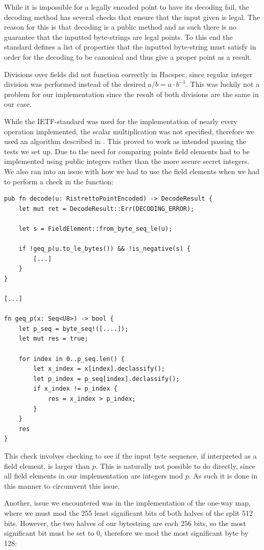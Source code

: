 \documentclass{article}
\newcommand*\ttvar[1]{\texttt{\expandafter\dottvar\detokenize{#1}\relax}}
\newcommand*\dottvar[1]{\ifx\relax#1\else
  \expandafter\ifx\string_#1\string_\allowbreak\else#1\fi
  \expandafter\dottvar\fi}
\begin{document}
While it is impossible for a legally encoded point to have its decoding
fail, the decoding method has several checks that ensure that the input
given is legal. The reason for this is that decoding is a public method
and as such there is no guarantee that the inputted byte-strings are
legal points. To this end the standard defines a list of properties
that the inputted byte-string must satisfy in order for the decoding
to be canonical and thus give a proper point as a result.

Divisions over fields did not function correctly in Hacspec, since regular integer division was performed instead of the desired $a/b = a \cdot b^{-1}$. This was luckily not a problem for our implementation since the result of both divisions are the same in our case.

While the IETF-standard was used for the implementation of nearly every
operation implemented, the scalar multiplication was not specified,
therefore we used an algorithm described in \cite{elliptic-curves}. This
proved to work as intended passing the tests we set up. Due to the
need for comparing points field elements had to be implemented using
public integers rather than the more secure secret integers. We also
ran into an issue with how we had to use the field elements when we
had to perform a check in the \ttvar{decode()} function:

\begin{lstlisting}
pub fn decode(u: RistrettoPointEncoded) -> DecodeResult {
	let mut ret = DecodeResult::Err(DECODING_ERROR);

	let s = FieldElement::from_byte_seq_le(u);

	if !geq_p(u.to_le_bytes()) && !is_negative(s) {
		[...]
	}
}

[...]

fn geq_p(x: Seq<U8>) -> bool {
	let p_seq = byte_seq!([....]);
	let mut res = true;

	for index in 0..p_seq.len() {
		let x_index = x[index].declassify();
		let p_index = p_seq[index].declassify();
		if x_index != p_index {
			res = x_index > p_index;
		}
	}
	res
}
\end{lstlisting}

This check involves checking to see if the input byte sequence,
if interpreted as a field element, is larger than $p$. This is
naturally not possible to do directly, since all field elements in
our implementation are integers mod $p$. As such it is done in this
manner to circumvent this issue.

Another, issue we encountered was in the implementation of the one-way
map, where we must mod the 255 least significant bits of both halves
of the split 512 bits. However, the two halves of our bytestring are
each 256 bits, so the most significant bit must be set to 0, therefore
we mod the most significant byte by 128:
\end{document}
